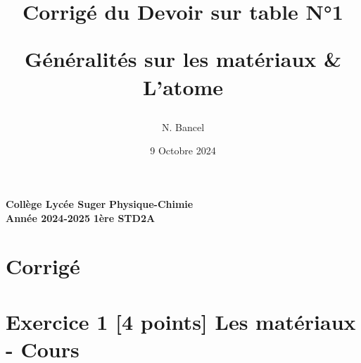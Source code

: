 \documentclass{exam}
\title{Corrigé du Devoir sur table N°1 \par 
Généralités sur les matériaux \& L'atome}
\author{N. Bancel}
\date{9 Octobre 2024}
\begin{document}
\textbf{Collège Lycée Suger}
\hfill
\textbf{Physique-Chimie} \\

\textbf{Année 2024-2025}
\hfill
\textbf{1ère STD2A} \par

{\let\newpage\relax\maketitle}

\section*{Corrigé}

\section*{Exercice 1 [4 points] Les matériaux - Cours}
\end{document}
